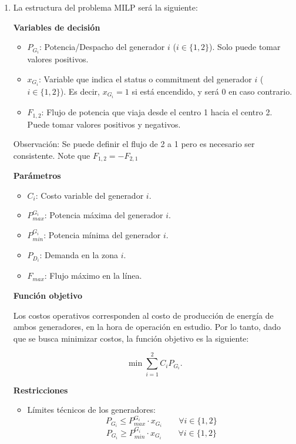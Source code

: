 \begin{enumerate}
\item
La estructura del problema MILP será la siguiente:

\textbf{Variables de decisión}
\begin{itemize}
    \item $P_{G_i}$: Potencia/Despacho del generador $i$ ($i \in \{1,2\}$). Solo puede tomar valores positivos. 
    
    \item $x_{G_i}$: Variable que indica el status o commitment del generador $i$ ($i \in \{1,2\}$). Es decir, $x_{G_i}=1$ si está encendido, y será 0 en caso contrario.
    
    \item $F_{1,2}$: Flujo de potencia que viaja desde el centro 1 hacia el centro 2. Puede tomar valores positivos y negativos.
\end{itemize}

Observación: Se puede definir el flujo de 2 a 1 pero es necesario ser consistente. Note que $F_{1,2}=-F_{2,1}$

\textbf{Parámetros}
\begin{itemize}
    \item $C_i$: Costo variable del generador $i$.
    
    \item $P_{max}^{G_i}$: Potencia máxima del generador $i$.
    
    \item $P_{min}^{G_i}$: Potencia mínima del generador $i$.
    
    \item $P_{D_i}$: Demanda en la zona $i$.
    
    \item $F_{max}$: Flujo máximo en la línea.
\end{itemize}

\textbf{Función objetivo}

Los costos operativos corresponden al costo de producción de energía de ambos generadores, en la hora de operación en estudio. Por lo tanto, dado que se busca minimizar costos, la función objetivo es la siguiente:

\begin{equation}
    \min \sum_{i=1}^{2} C_i P_{G_i}.
\end{equation}

\textbf{Restricciones}

\begin{itemize}
    \item Límites técnicos de los generadores:
    \begin{equation}
        P_{G_i} \leq P_{max}^{G_i}\cdot x_{G_i}
    \qquad \forall i \in \{1,2\}
    \end{equation}
    \begin{equation}
        P_{G_i} \geq P_{min}^{G_i}\cdot x_{G_i}
    \qquad \forall i \in \{1,2\}
    \end{equation}


\end{itemize}
\end{enumerate}
